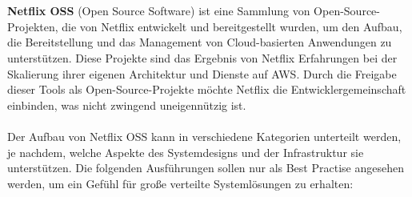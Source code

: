 \\\\
\textbf{Netflix OSS} (Open Source Software) ist eine Sammlung von Open-Source-Projekten, die von Netflix entwickelt und bereitgestellt wurden, um den Aufbau, die Bereitstellung und das Management von Cloud-basierten Anwendungen zu unterstützen. Diese Projekte sind das Ergebnis von Netflix Erfahrungen bei der Skalierung ihrer eigenen Architektur und Dienste auf AWS. Durch die Freigabe dieser Tools als Open-Source-Projekte möchte Netflix die Entwicklergemeinschaft einbinden, was nicht zwingend uneigennützig ist.
\\\\
Der Aufbau von Netflix OSS kann in verschiedene Kategorien unterteilt werden, je nachdem, welche Aspekte des Systemdesigns und der Infrastruktur sie unterstützen. Die folgenden Ausführungen sollen nur als Best Practise angesehen werden, um ein Gefühl für große verteilte Systemlösungen zu erhalten:
